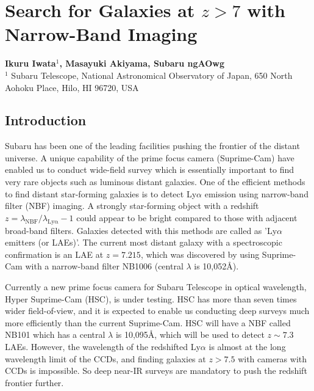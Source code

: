 \def\thisdir{science/veryhighz/}


\section{Search for Galaxies at $z>7$ with Narrow-Band Imaging
\label{sec:nbf}}

\noindent
\begin{center}
{\bf Ikuru Iwata$^{1}$, Masayuki Akiyama, Subaru ngAOwg}\\
$^1$ Subaru Telescope, National Astronomical Observatory of Japan, 650
North Aohoku Place, Hilo, HI 96720, USA
\end{center}
\vspace{0.5cm}

\subsection{Introduction}

Subaru has been one of the leading facilities pushing the frontier of
the distant universe. A unique capability of the prime focus camera
(Suprime-Cam) have enabled us to conduct wide-field survey which is
essentially important to find very rare objects such as luminous distant
galaxies. One of the efficient methods to find distant star-forming
galaxies is to detect Ly$\alpha$ emission using narrow-band filter (NBF) 
imaging. A strongly star-forming object with a redshift 
$z = \lambda_\mathrm{NBF} / \lambda_\mathrm{Ly\alpha} -1$ could
appear to be bright compared to those with adjacent broad-band
filters. Galaxies detected with this methods are called as 'Ly$\alpha$
emitters (or LAEs)'. The current most distant galaxy with a spectroscopic 
confirmation is an LAE at $z=7.215$, which was discovered by
\citet{Shibuya2012} using Suprime-Cam with a narrow-band filter NB1006
(central $\lambda$ is 10,052\AA).

Currently a new prime focus camera for Subaru Telescope in optical
wavelength, Hyper Suprime-Cam (HSC), is under testing. HSC has more than
seven times wider field-of-view, and it is expected to enable us
conducting deep surveys much more efficiently than the current
Suprime-Cam. HSC will have a NBF called NB101 which has a central
$\lambda$ is 10,095\AA, which will be used to detect $z\sim 7.3$
LAEs. 
However, the wavelength of the redshifted Ly$\alpha$ is almost at the
long wavelength limit of the CCDs, and finding galaxies at $z>7.5$ with
cameras with CCDs is impossible. So deep near-IR surveys are mandatory
to push the redshift frontier further.

